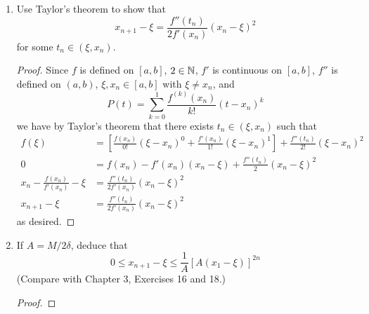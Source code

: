 \documentclass[../psets.tex]{subfiles}
\begin{document}
\begin{enumerate}[label={\textbf{\arabic*.}}]
\begin{enumerate}
\begin{proof}
\begin{align*}
                f(x) &= 0
            \end{align*}
            so $x=\xi$ by the uniqueness of $\xi$.
        \end{proof}
        \item Use Taylor's theorem to show that
        \begin{equation*}
            x_{n+1}-\xi = \frac{f''(t_n)}{2f'(x_n)}(x_n-\xi)^2
        \end{equation*}
        for some $t_n\in(\xi,x_n)$.
        \begin{proof}
            Since $f$ is defined on $[a,b]$, $2\in\mathbb{N}$, $f'$ is continuous on $[a,b]$, $f''$ is defined on $(a,b)$, $\xi,x_n\in[a,b]$ with $\xi\neq x_n$, and
            \begin{equation*}
                P(t) = \sum_{k=0}^1\frac{f^{(k)}(x_n)}{k!}(t-x_n)^k
            \end{equation*}
            we have by Taylor's theorem that there exists $t_n\in(\xi,x_n)$ such that
            \begin{align*}
                f(\xi) &= \left[ \frac{f(x_n)}{0!}(\xi-x_n)^0+\frac{f'(x_n)}{1!}(\xi-x_n)^1 \right]+\frac{f''(t_n)}{2!}(\xi-x_n)^2\\
                0 &= f(x_n)-f'(x_n)(x_n-\xi)+\frac{f''(t_n)}{2}(x_n-\xi)^2\\
                x_n-\frac{f(x_n)}{f'(x_n)}-\xi &= \frac{f''(t_n)}{2f'(x_n)}(x_n-\xi)^2\\
                x_{n+1}-\xi &= \frac{f''(t_n)}{2f'(x_n)}(x_n-\xi)^2
            \end{align*}
            as desired.
        \end{proof}
        \item If $A=M/2\delta$, deduce that
        \begin{equation*}
            0 \leq x_{n+1}-\xi \leq \frac{1}{A}[A(x_1-\xi)]^{2n}
        \end{equation*}
        (Compare with Chapter 3, Exercises 16 and 18.)
        \begin{proof}


\end{proof}
\end{enumerate}
\end{enumerate}
\end{document}
